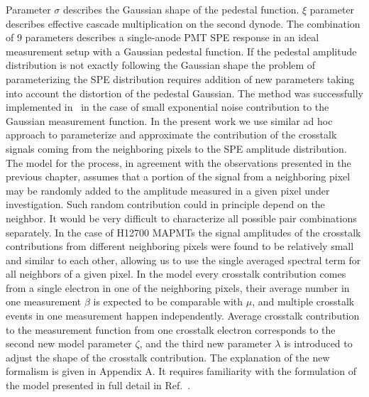 Parameter ${\sigma}$ describes the Gaussian shape of the pedestal function. ${\xi}$ parameter describes effective cascade multiplication on the second dynode. The combination of 9 parameters describes a single-anode PMT SPE response in an ideal measurement setup with a Gaussian pedestal function. If the pedestal amplitude distribution is not exactly following the Gaussian shape the problem of parameterizing the SPE distribution requires addition of new parameters taking into account the distortion of the pedestal Gaussian. The method was successfully implemented in~\cite{DEGTIARENKO20171} in the case of small exponential noise contribution to the Gaussian measurement function. In the present work we use similar ad hoc approach to parameterize and approximate the contribution of the crosstalk signals coming from the neighboring pixels to the SPE amplitude distribution. The model for the process, in agreement with the observations presented in the previous chapter, assumes that a portion of the signal from a neighboring pixel may be randomly added to the amplitude measured in a given pixel under investigation. Such random contribution could in principle depend on the neighbor. It would be very difficult to characterize all possible pair combinations separately. In the case of H12700 MAPMTs the signal amplitudes of the crosstalk contributions from different neighboring pixels were found to be relatively small and similar to each other, allowing us to use the single averaged spectral term for all neighbors of a given pixel. In the model every crosstalk contribution comes from a single electron in one of the neighboring pixels, their average number in one measurement $\beta$ is expected to be comparable with $\mu$, and multiple crosstalk events in one measurement happen independently. Average crosstalk contribution to the measurement function from one crosstalk electron corresponds to the second new model parameter $\zeta$, and the third new parameter $\lambda$ is introduced to adjust the shape of the crosstalk contribution. The explanation of the new formalism is given in Appendix A. It requires familiarity with the formulation of the model presented in full detail in Ref.~\cite{DEGTIARENKO20171}.

